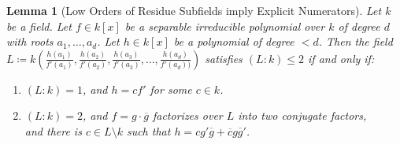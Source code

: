 \documentclass[10pt,a4paper]{amsart}
\newtheorem{lemma}{Lemma}
\begin{document}
\begin{lemma}[Low Orders of Residue Subfields imply Explicit Numerators]\label{lem: explicit h for residues field of orders 1,2}
    Let $k$ be a field. Let $f\in k[x]$ be a separable irreducible polynomial over $k$ of degree $d$ with roots $a_1,\ldots,a_d$.  Let $h\in k[x]$ be a polynomial of degree $<d$.
    Then the field $L\coloneqq k\left(\frac{h(a_1)}{f'(a_1)},\frac{h(a_2)}{f'(a_2)} ,\frac{h(a_3)}{f'(a_3)}, \ldots, \frac{h(a_d)}{f'(a_d))}\right)$
    satisfies $(L:k) \le 2$ if and only if:
    \begin{enumerate}
        \item $(L:k) =1$, and $h=cf'$ for some $c\in k$.
        \item $(L:k) = 2$, and $f=g\cdot \overline{g}$ factorizes over $L$ into two conjugate factors, 
        \\and there is $c\in L\setminus k$ such that $h=cg' \overline{g}+ \overline{c}g\overline{g}'$.
    \end{enumerate}
\end{lemma}
\end{document}
